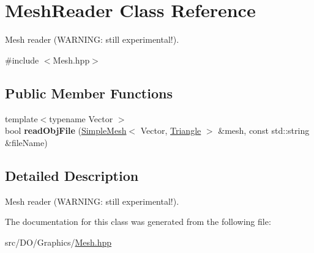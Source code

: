 \hypertarget{class_d_o_1_1_mesh_reader}{\section{Mesh\-Reader Class Reference}
\label{class_d_o_1_1_mesh_reader}
}


Mesh reader (W\-A\-R\-N\-I\-N\-G\-: still experimental!).  




{\ttfamily \#include $<$Mesh.\-hpp$>$}

\subsection*{Public Member Functions}
\begin{DoxyCompactItemize}
\item 
\hypertarget{class_d_o_1_1_mesh_reader_a53486d6b37f8340b30a099d32722cb07}{{\footnotesize template$<$typename Vector $>$ }\\bool {\bfseries read\-Obj\-File} (\hyperlink{class_d_o_1_1_simple_mesh}{Simple\-Mesh}$<$ Vector, \hyperlink{group___draw3_d_ga0ca67ac512a882951211499a31ab60a0}{Triangle} $>$ \&mesh, const std\-::string \&file\-Name)}\label{class_d_o_1_1_mesh_reader_a53486d6b37f8340b30a099d32722cb07}

\end{DoxyCompactItemize}


\subsection{Detailed Description}
Mesh reader (W\-A\-R\-N\-I\-N\-G\-: still experimental!). 

The documentation for this class was generated from the following file\-:\begin{DoxyCompactItemize}
\item 
src/\-D\-O/\-Graphics/\hyperlink{_mesh_8hpp}{Mesh.\-hpp}\end{DoxyCompactItemize}
